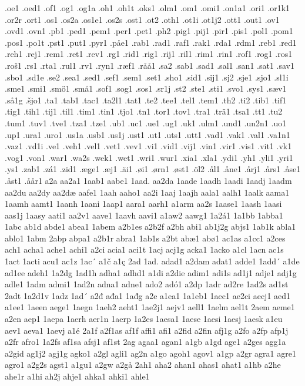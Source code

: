 .oe1
.oed1
.of1
.og1
.og1a
.oh1
.oh1t
.oks1
.olm1
.om1
.omi1
.on1a1
.ori1
.or1k1
.or2r
.ort1
.os1
.os2a
.os1e1
.os2s
.ost1
.ot2
.oth1
.ot1i
.ot1j2
.ott1
.out1
.ov1
.ovd1
.ovn1
.pb1
.ped1
.pem1
.per1
.pet1
.ph2
.pig1
.pij1
.pir1
.pis1
.pol1
.pom1
.pos1
.po1t
.pst1
.put1
.pyr1
.påe1
.rab1
.rad1
.raf1
.rak1
.rda1
.rdm1
.reb1
.red1
.reh1
.rej1
.rem1
.ret1
.rev1
.rg1
.rid1
.rig1
.rij1
.ril1
.rim1
.rin1
.rof1
.rog1
.ros1
.roš1
.rs1
.rta1
.rul1
.rv1
.ryn1
.ræf1
.råå1
.sa2
.sab1
.sad1
.sal1
.san1
.sat1
.sav1
.sbo1
.sd1e
.se2
.sea1
.sed1
.sef1
.sem1
.set1
.sho1
.sid1
.sij1
.sj2
.sje1
.sjo1
.sl1i
.sme1
.smi1
.smö1
.små1
.sof1
.sog1
.sos1
.sr1j
.st2
.ste1
.sti1
.svo1
.sys1
.sæv1
.så1g
.šjo1
.ta1
.tab1
.tac1
.ta2l1
.tat1
.te2
.tee1
.tel1
.tem1
.th2
.ti2
.tib1
.tif1
.tig1
.tih1
.tij1
.til1
.tim1
.tin1
.tjo1
.tn1
.tor1
.tov1
.tra1
.trä1
.tsa1
.tt1
.tu2
.tum1
.tuv1
.tve1
.tza1
.tze1
.ub1
.uc1
.ue1
.ug1
.uk1
.ulm1
.und1
.un2n1
.uo1
.up1
.ura1
.uro1
.us1a
.usb1
.us1j
.ust1
.ut1
.uts1
.utt1
.vad1
.vak1
.val1
.va1n1
.vaz1
.vd1i
.ve1
.veh1
.vel1
.vet1
.vev1
.vi1
.vid1
.vij1
.vin1
.vir1
.vis1
.vit1
.vk1
.vog1
.von1
.war1
.wa2s
.wek1
.wet1
.wri1
.wur1
.xia1
.xla1
.ydi1
.yh1
.yli1
.yri1
.ys1
.zab1
.zá1
.zid1
.æge1
.æj1
.äi1
.øi1
.ørn1
.øst1
.öl2
.ål1
.åne1
.årj1
.års1
.åse1
.åst1
.åår1
a2a
aa2a1
1aab1
aabe1
1aad.
aa2da
1aade
1aadh
1aadi
1aadj
1aadm
aa2du
aa2dy
aa2dæ
aafe1
1aah
aaho1
aa2i
1aaj
1aajh
aala1
aalh1
1aalk
aama1
1aamh
aamt1
1aanh
1aani
1aap1
aara1
aarh1
a1arm
aa2s
1aase1
1aash
1aasi
aas1j
1aasy
aati1
aa2v1
aave1
1aavh
aavi1
a1aw2
aawg1
1a2á1
1a1bb
1abba1
1abc
ab1d
abde1
abea1
1abem
a2b1es
a2b2f
a2bh
abi1
ab1j2g
abjs1
1ab1k
abla1
ablo1
1abm
2abp
abpa1
a2b1r
abra1
1ab1s
a2bt
abæ1
abø1
ac1as
a1cc1
a2ces
ach1
acha1
ache1
achi1
a2ci
acia1
aci1t
1acj
acj1g
acka1
1acko
a1cl
1acn
ac1s
1act
1acti
acu1
ac1z
1ac´
a1č
a1ç
2ad
1ad.
adad1
a2dam
adat1
adde1
1add´
a1de
ad1ee
adeh1
1a2dg
1ad1h
adha1
adhd1
a1di
a2die
adim1
adi1s
ad1j1
adje1
adj1g
adle1
1adm
admi1
1ad2n
adna1
adne1
ado2
adó1
a2dp
1adr
ad2re
1ad2s
ad1st
2adt
1a2d1v
1adz
1ad´
a2đ
ađa1
1ađg
a2e
a1ea1
1a1eb1
1aec1
ae2ci
aecj1
aed1
a1ee1
1aeen
aege1
1aegn
1aeh2
aeht1
1ae2j1
aejv1
aell1
1aelm
ael1t
2aem
aeme1
a2en
aep1
1aepa
1aerh
aer1n
1aerp
1a2es
1aesa1
1aese
1aesi
1aesj
1aesk
a1eu
aev1
aeva1
1aevj
a1é
2a1f
a2f1as
af1f
affi1
afi1
a2fid
a2fin
afj1g
a2fo
a2fp
afp1j
a2fr
afro1
1a2fs
af1sa
afsj1
af1st
2ag
agaa1
agan1
a1gb
a1gd
age1
a2ges
agg1a
a2gid
ag1j2
agj1g
agko1
a2gl
agli1
ag2n
a1go
agoh1
agov1
a1gp
a2gr
agra1
agre1
agro1
a2g2s
agst1
a1gu1
a2gw
a2gå
2ah1
aha2
ahan1
ahas1
ahat1
a1hb
a2he
ahe1r
a1hi
ah2j
ahje1
ahka1
ahki1
ahle1
